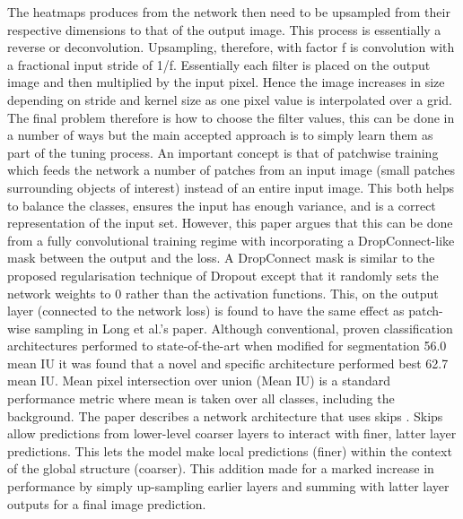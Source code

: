 \documentclass[a4paper,11pt,notitlepage]{article}
\begin{document}
The heatmaps produces from the network then need to be upsampled from their respective dimensions to that of the output image. This process is essentially a reverse or deconvolution. Upsampling, therefore, with factor f is convolution with a fractional input stride of 1/f. Essentially each filter is placed on the output image and then multiplied by the input pixel. Hence the image increases in size depending on stride and kernel size as one pixel value is interpolated over a grid. The final problem therefore is how to choose the filter values, this can be done in a number of ways but the main accepted approach is to simply learn them as part of the tuning process.
\newline \newline
An important concept is that of patchwise training which feeds the network a number of patches from an input image (small patches surrounding objects of interest) instead of an entire input image. This both helps to balance the classes, ensures the input has enough variance, and is a correct representation of the input set. However, this paper argues that this can be done from a fully convolutional training regime with incorporating a DropConnect-like mask \cite{Wan:2013:RNN:3042817.3043055} between the output and the loss. A DropConnect mask is similar to the proposed regularisation technique of Dropout \cite{JMLR:v15:srivastava14a} except that it randomly sets the network weights to 0 rather than the activation functions. This, on the output layer (connected to the network loss) is found to have the same effect as patch-wise sampling in Long et al.'s paper.
\newline \newline
Although conventional, proven classification architectures performed to state-of-the-art when modified for segmentation 56.0 mean IU it was found that a novel and specific architecture performed best 62.7 mean IU. Mean pixel intersection over union (Mean IU) is a standard performance metric where mean is taken over all classes, including the background. The paper describes a network architecture that uses skips \cite{Bishop:2006:PRM:1162264}. Skips allow predictions from lower-level coarser layers to interact with finer, latter layer predictions. This lets the model make local predictions (finer) within the context of the global structure (coarser). This addition made for a marked increase in performance by simply up-sampling earlier layers and summing with latter layer outputs for a final image prediction.
\end{document}
